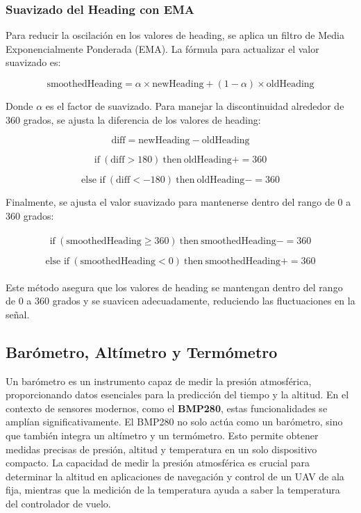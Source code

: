     \subsubsection{Suavizado del Heading con EMA}

        Para reducir la oscilación en los valores de heading, se aplica un filtro de Media Exponencialmente Ponderada (EMA). La fórmula para actualizar el valor suavizado es:

        \[
        \text{smoothedHeading} = \alpha \times \text{newHeading} + (1 - \alpha) \times \text{oldHeading}
        \]

        Donde \(\alpha\) es el factor de suavizado. Para manejar la discontinuidad alrededor de 360 grados, se ajusta la diferencia de los valores de heading:

        \[
        \text{diff} = \text{newHeading} - \text{oldHeading}
        \]

        \[
        \text{if} \ (\text{diff} > 180) \ \text{then} \ \text{oldHeading} += 360
        \]

        \[
        \text{else if} \ (\text{diff} < -180) \ \text{then} \ \text{oldHeading} -= 360
        \]

        Finalmente, se ajusta el valor suavizado para mantenerse dentro del rango de 0 a 360 grados:
        \\ \\
        \[
        \text{if} \ (\text{smoothedHeading} \geq 360) \ \text{then} \ \text{smoothedHeading} -= 360
        \]

        \[
        \text{else if} \ (\text{smoothedHeading} < 0) \ \text{then} \ \text{smoothedHeading} += 360
        \]
        \\ 
        Este método asegura que los valores de heading se mantengan dentro del rango de 0 a 360 grados y se suavicen adecuadamente, reduciendo las fluctuaciones en la señal.



\subsection{Barómetro, Altímetro y Termómetro}
    Un barómetro es un instrumento capaz de medir la presión atmosférica, proporcionando datos esenciales para la predicción del tiempo y la altitud. En el contexto de sensores modernos, como el \textbf{BMP280}, estas funcionalidades se amplían significativamente. El BMP280 no solo actúa como un barómetro, sino que también integra un altímetro y un termómetro. Esto permite obtener medidas precisas de presión, altitud y temperatura en un solo dispositivo compacto. La capacidad de medir la presión atmosférica es crucial para determinar la altitud en aplicaciones de navegación y control de un UAV de ala fija, mientras que la medición de la temperatura ayuda a saber la temperatura del controlador de vuelo.


